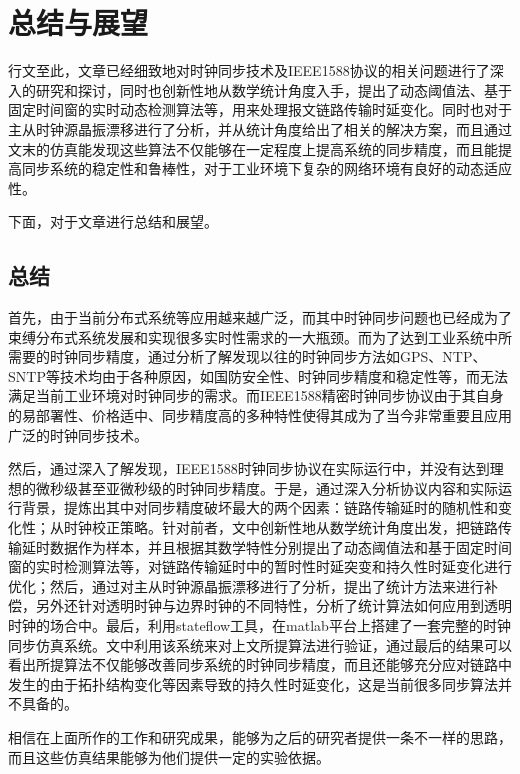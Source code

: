 
\chapter{总结与展望}
行文至此，文章已经细致地对时钟同步技术及IEEE1588协议的相关问题进行了深入的研究和探讨，同时也创新性地从数学统计角度入手，提出了动态阈值法、基于固定时间窗的实时动态检测算法等，用来处理报文链路传输时延变化。同时也对于主从时钟源晶振漂移进行了分析，并从统计角度给出了相关的解决方案，而且通过文末的仿真能发现这些算法不仅能够在一定程度上提高系统的同步精度，而且能提高同步系统的稳定性和鲁棒性，对于工业环境下复杂的网络环境有良好的动态适应性。

下面，对于文章进行总结和展望。

\section{总结}
首先，由于当前分布式系统等应用越来越广泛，而其中时钟同步问题也已经成为了束缚分布式系统发展和实现很多实时性需求的一大瓶颈。而为了达到工业系统中所需要的时钟同步精度，通过分析了解发现以往的时钟同步方法如GPS、NTP、SNTP等技术均由于各种原因，如国防安全性、时钟同步精度和稳定性等，而无法满足当前工业环境对时钟同步的需求。而IEEE1588精密时钟同步协议由于其自身的易部署性、价格适中、同步精度高的多种特性使得其成为了当今非常重要且应用广泛的时钟同步技术。

然后，通过深入了解发现，IEEE1588时钟同步协议在实际运行中，并没有达到理想的微秒级甚至亚微秒级的时钟同步精度。于是，通过深入分析协议内容和实际运行背景，提炼出其中对同步精度破坏最大的两个因素：链路传输延时的随机性和变化性；从时钟校正策略。针对前者，文中创新性地从数学统计角度出发，把链路传输延时数据作为样本，并且根据其数学特性分别提出了动态阈值法和基于固定时间窗的实时检测算法等，对链路传输延时中的暂时性时延突变和持久性时延变化进行优化；然后，通过对主从时钟源晶振漂移进行了分析，提出了统计方法来进行补偿，另外还针对透明时钟与边界时钟的不同特性，分析了统计算法如何应用到透明时钟的场合中。最后，利用stateflow工具，在matlab平台上搭建了一套完整的时钟同步仿真系统。文中利用该系统来对上文所提算法进行验证，通过最后的结果可以看出所提算法不仅能够改善同步系统的时钟同步精度，而且还能够充分应对链路中发生的由于拓扑结构变化等因素导致的持久性时延变化，这是当前很多同步算法并不具备的。

相信在上面所作的工作和研究成果，能够为之后的研究者提供一条不一样的思路，而且这些仿真结果能够为他们提供一定的实验依据。 

